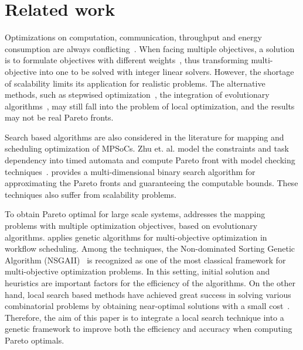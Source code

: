 \vspace{-2pt}
\section{Related work\label{se:re}}
Optimizations on computation, communication, throughput and energy consumption are always conflicting~\cite{lin2012communication,IEICE14,FM15}. When facing multiple objectives, a solution is to formulate objectives with different weights~\cite{IEICE14}, thus transforming multi-objective into one to be solved with integer linear solvers.
However, the shortage of scalability limits its application for realistic problems.
The alternative methods, such as stepwised optimization~\cite{IEICE14}, the integration of evolutionary algorithms~\cite{lin2012communication}, may still fall into the problem of local optimization, and the results may not be real Pareto fronts.

Search based algorithms are also considered in the literature for mapping and scheduling optimization of MPSoCs. Zhu et. al. model the constraints and task dependency into timed automata and compute Pareto front with model checking techniques~\cite{FM15}.
\cite{legriel2010approximating} provides a multi-dimensional binary search algorithm for approximating the Pareto fronts and guaranteeing the computable bounds. These techniques also suffer from scalability problems.

To obtain Pareto optimal for large scale systems, \cite{thiele2007mapping} addresses the mapping problems with multiple optimization objectives, based on evolutionary algorithms. \cite{yassa2013genetic} applies genetic algorithms for multi-objective optimization in workflow scheduling. Among the techniques, the Non-dominated Sorting Genetic Algorithm (NSGAII)~\cite{deb2002fast} is recognized as one of the most classical framework for multi-objective optimization problems. %
In this setting, initial solution and heuristics are important factors for the efficiency of the algorithms. On the other hand, local search based methods have achieved great success in solving various combinatorial problems by obtaining near-optimal solutions with a small cost~\cite{wang2016two}. Therefore, the aim of this paper is to integrate a local search technique into a genetic framework to improve both the efficiency and accuracy when computing Pareto optimals.

